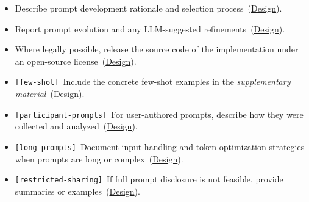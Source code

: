 \documentclass[smallextended]{svjour3}
\makeatletter
\newcommand{\must}{\textbf{must}\xspace}
\newcommand{\should}{\textbf{should}\xspace}
\newcommand{\paper}{\emph{paper}\xspace}
\newcommand{\supplementarymaterial}{\emph{supplementary material}\xspace}
\newcommand{\paper}{\emph{paper}\xspace}
\newcommand{\supplementarymaterial}{\emph{supplementary material}\xspace}
\newcommand{\iconS}{\usebox{\iconSbox}\xspace}
\newcommand{\iconS}{○\xspace}
\newcommand{\condition}[1]{\texttt{\small[#1]}\,}
\newcommand{\condition}[1]{@@cond:#1@@}
\newcommand{\refdesign}{\hyperref[sec:report-system-and-prompt-design]{Design}}
\newcommand{\refdesign}{\href{/guidelines/design/}{Design}}
\makeatother
\begin{document}
\begin{appendices}
\begin{itemize}[label={},leftmargin=*]
    \item \iconS Describe prompt development rationale and selection process~(\refdesign).
    \item \iconS Report prompt evolution and any LLM-suggested refinements~(\refdesign).
    \item \iconS Where legally possible, release the source code of the implementation under an open-source license~(\refdesign).
    \item \iconS \condition{few-shot} Include the concrete few-shot examples in the \supplementarymaterial~(\refdesign).
    \item \iconS \condition{participant-prompts} For user-authored prompts, describe how they were collected and analyzed~(\refdesign).
    \item \iconS \condition{long-prompts} Document input handling and token optimization strategies when prompts are long or complex~(\refdesign).
    \item \iconS \condition{restricted-sharing} If full prompt disclosure is not feasible, provide summaries or examples~(\refdesign).

\end{itemize}
\end{appendices}
\end{document}

